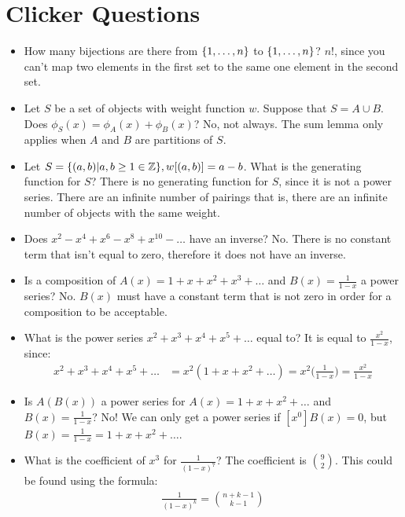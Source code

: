 \documentclass[]{article}
\theoremstyle{definition}
\newcommand{\union}{\cup}
\newcommand{\lecture}[1]{\marginpar{{\footnotesize $\leftarrow$ \underline{#1}}}}
\DeclarePairedDelimiter{\set}{\lbrace}{\rbrace}
\begin{document}
	\section*{Clicker Questions}
		\begin{itemize}
			\item \lecture{January 21, 2013} How many bijections are there from $\set{1, \ldots, n}$ to $\set{1, \ldots, n}$? $n!$, since you can't map two elements in the first set to the same one element in the second set.
			\item Let $S$ be a set of objects with weight function $w$. Suppose that $S = A \union B$. Does $\phi_S(x) = \phi_A(x) + \phi_B(x)$? No, not always. The sum lemma only applies when $A$ and $B$ are partitions of $S$.
			\item Let $S = \set{(a, b) | a, b \ge 1 \in \mathbb{Z}}, w[(a, b)] = a - b$. What is the generating function for $S$? There is no generating function for $S$, since it is not a power series. There are an infinite number of pairings \textendash{} that is, there are an infinite number of objects with the same weight.
			\item Does $x^2 - x^4 + x^6 - x^8 + x^10 - \ldots$ have an inverse? No. There is no constant term that isn't equal to zero, therefore it does not have an inverse.
			\item Is a composition of $A(x) = 1 + x + x^2 + x^3 + \ldots$ and $B(x) = \frac{1}{1 - x}$ a power series? No. $B(x)$ must have a constant term that is not zero in order for a composition to be acceptable.
			\item \lecture{January 30, 2013} What is the power series $x^2 + x^3 + x^4 + x^5 + \ldots$ equal to? It is equal to $\frac{x^2}{1 - x}$, since:
				\begin{align*}
					x^2 + x^3 + x^4 + x^5 + \ldots &= x^2(1 + x + x^2 + \ldots) = x^2 \bigg(\frac{1}{1 - x}\bigg) = \frac{x^2}{1 - x}
				\end{align*}
			\item Is $A(B(x))$ a power series for $A(x) = 1 + x + x^2 + \ldots$ and $B(x) = \frac{1}{1 - x}$? No! We can only get a power series if $[x^0]B(x) = 0$, but $B(x) = \frac{1}{1 - x} = 1 + x + x^2 + \ldots$.
			\item What is the coefficient of $x^3$ for $\frac{1}{(1 - x)^7}$? The coefficient is $\binom{9}{2}$. This could be found using the formula:
				\begin{align*}
					[x^n] \frac{1}{(1 - x)^k} = \binom{n + k - 1}{k - 1}
				\end{align*}

\end{itemize}
\end{document}
